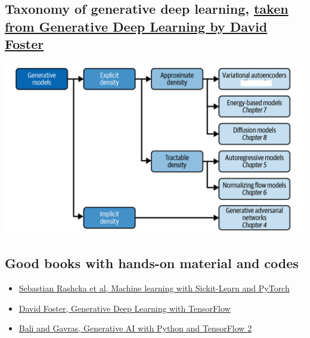 \documentclass[%
oneside,                 %
final,                   %
10pt]{article}
\begin{document}
\subsection{Taxonomy of generative deep learning, \href{{https://www.oreilly.com/library/view/generative-deep-learning/9781098134174/ch01.html}}{taken from Generative Deep Learning by David Foster}}

\vspace{6mm}

\centerline{\includegraphics[width=1.0\linewidth]{figures/generativemodels.png}}

\vspace{6mm}

\subsection{Good books with hands-on material and codes}
\begin{block}{}
\begin{itemize}
\item \href{{https://sebastianraschka.com/blog/2022/ml-pytorch-book.html}}{Sebastian Rashcka et al, Machine learning with Sickit-Learn and PyTorch}

\item \href{{https://www.oreilly.com/library/view/generative-deep-learning/9781098134174/ch01.html}}{David Foster, Generative Deep Learning with TensorFlow}

\item \href{{https://github.com/PacktPublishing/Hands-On-Generative-AI-with-Python-and-TensorFlow-2}}{Bali and Gavras, Generative AI with Python and TensorFlow 2}
\end{itemize}

\noindent
\end{block}
\end{document}
